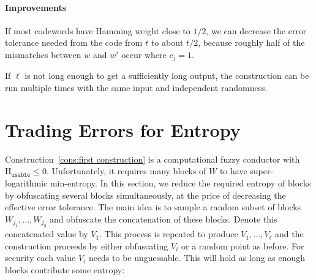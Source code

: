 \documentclass[11pt]{article}
\newcommand{\consref}[1]{\mbox{Construction~\ref{#1}}}
\newcommand{\Huse}{\mathrm{H}_{\mathtt{usable}}}
\newcommand{\authnote}[2]{{\textcolor{red}{\textsf{#1 notes: }\textcolor{blue}{ #2}}\marginpar{\textcolor{red}{\textbf{!!!!!}}}}}
\newcommand{\authnote}[2]{}
\newcommand{\lnote}[1]{{\authnote{Leo}{#1}}}
\begin{document}
\paragraph{Improvements}  If most codewords have Hamming weight close to $1/2$, we can decrease the error tolerance needed from the code from $t$ to  about $t/2$, because roughly half of the mismatches between $w$ and $w'$ occur where $c_j =1$. 

If $\ell$ is not long enough to get a sufficiently long output, the construction can be run multiple times with the same input and independent randomness. 



\section{Trading Errors for Entropy}
\label{sec:sampling}
\consref{cons:first construction} is a computational fuzzy conductor with $\Huse\le 0$.  Unfortunately, it requires many blocks of $W$ to have super-logarithmic min-entropy.  In this section, we reduce the required entropy of blocks by obfuscating several blocks simultaneously, at the price of  decreasing the effective error tolerance.
The main idea is to sample a random subset of blocks $W_{j_1},..., W_{j_\eta}$ and obfuscate the concatenation of these blocks.  Denote this concatenated value by $V_1$.  This process is repeated to produce $V_1,..., V_\ell$ and the construction proceeds by either obfuscating $V_i$ or a random point as before. For security each value $V_i$ needs to be unguessable.  This will hold as long as enough blocks contribute some entropy:
\end{document}
